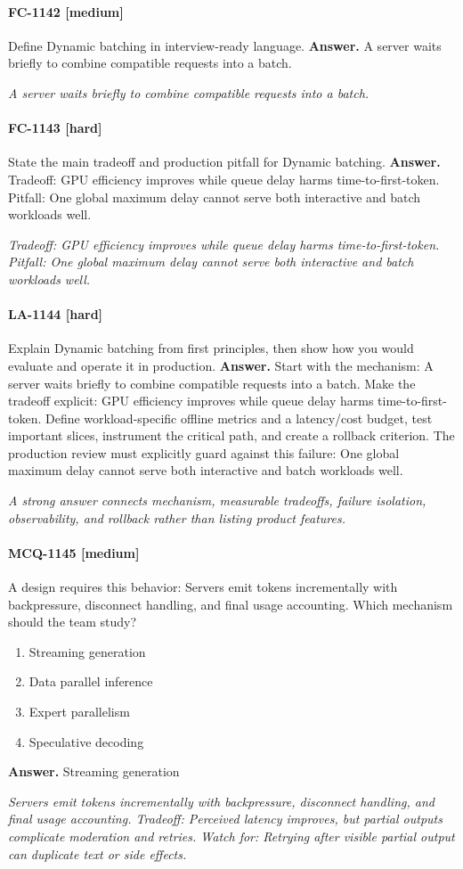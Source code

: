 \paragraph{FC-1142 [medium]} Define Dynamic batching in interview-ready language.
\noindent\textbf{Answer.} A server waits briefly to combine compatible requests into a batch.
\par\textit{A server waits briefly to combine compatible requests into a batch.}
\paragraph{FC-1143 [hard]} State the main tradeoff and production pitfall for Dynamic batching.
\noindent\textbf{Answer.} Tradeoff: GPU efficiency improves while queue delay harms time-to-first-token. Pitfall: One global maximum delay cannot serve both interactive and batch workloads well.
\par\textit{Tradeoff: GPU efficiency improves while queue delay harms time-to-first-token. Pitfall: One global maximum delay cannot serve both interactive and batch workloads well.}
\paragraph{LA-1144 [hard]} Explain Dynamic batching from first principles, then show how you would evaluate and operate it in production.
\noindent\textbf{Answer.} Start with the mechanism: A server waits briefly to combine compatible requests into a batch. Make the tradeoff explicit: GPU efficiency improves while queue delay harms time-to-first-token. Define workload-specific offline metrics and a latency/cost budget, test important slices, instrument the critical path, and create a rollback criterion. The production review must explicitly guard against this failure: One global maximum delay cannot serve both interactive and batch workloads well.
\par\textit{A strong answer connects mechanism, measurable tradeoffs, failure isolation, observability, and rollback rather than listing product features.}
\paragraph{MCQ-1145 [medium]} A design requires this behavior: Servers emit tokens incrementally with backpressure, disconnect handling, and final usage accounting. Which mechanism should the team study?
\begin{enumerate}[label=\Alph*.]
\item Streaming generation
\item Data parallel inference
\item Expert parallelism
\item Speculative decoding
\end{enumerate}
\noindent\textbf{Answer.} Streaming generation
\par\textit{Servers emit tokens incrementally with backpressure, disconnect handling, and final usage accounting. Tradeoff: Perceived latency improves, but partial outputs complicate moderation and retries. Watch for: Retrying after visible partial output can duplicate text or side effects.}
